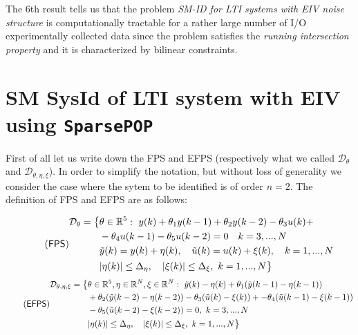 The 6th result tells us that the problem \textit{SM-ID for LTI systems with EIV noise structure} is computationally tractable for a rather large number of I/O experimentally collected data since the problem satisfies the \textit{running intersection property} and it is characterized by bilinear constraints.

\section{SM SysId of LTI system with EIV using \texttt{SparsePOP}}
First of all let us write down the FPS and EFPS (respectively what we called $\mathcal{D}_\theta$ and $\mathcal{D}_{\theta, \eta, \xi}$). In order to simplify the notation, but without loss of generality we consider the case where the sytem to be identified is of order $n=2$. The definition of FPS and EFPS are as follows:

\begin{equation} \label{eq:FPS} \tag{\textsf{FPS}}
    \begin{aligned}
        \mathcal{D}_\theta = \big\{&\theta\in\mathbb{R}^5: \ 
            y(k)+\theta_1{y(k-1)}+\theta_2{y(k-2)}
            -\theta_3{u(k)}+\\
            &-\theta_4{u(k-1)}-\theta_5{u(k-2)}=0 \quad k=3,...,N\\
            &\tilde{y}(k) = y(k) + \eta(k), \quad
            \tilde{u}(k) = u(k) + \xi(k), \quad k=1,..., N\\
            &\vert{\eta(k)}\vert \le \Delta_\eta, \quad 
            \vert{\xi(k)}\vert \le \Delta_\xi, \ k=1,...,N
        \big\}
    \end{aligned}
\end{equation}
\begin{equation}\label{eq:EFPS} \tag{\textsf{EFPS}}
    \begin{aligned}
        \mathcal{D}_{\theta,\eta, \xi} = \big\{
            &\theta\in\mathbb{R}^5,
            \eta \in \mathbb{R}^N, 
            \xi \in \mathbb{R}^N: \
            \tilde{y}(k) - \eta(k) +\theta_1(\tilde{y}(k-1)-\eta(k-1)) \\
            &+\theta_2(\tilde{y}(k-2)-\eta(k-2))-\theta_3(\tilde{u}(k)-\xi(k))+ -\theta_4(\tilde{u}(k-1)-\xi(k-1))\\
            &-\theta_5(\tilde{u}(k-2)-\xi(k-2))=0, \  k=3,...,N \\
            &\vert{\eta(k)}\vert \le \Delta_\eta, \quad 
            \vert{\xi(k)}\vert \le \Delta_\xi, \ k=1,...,N
        \big\}
    \end{aligned}
\end{equation}

